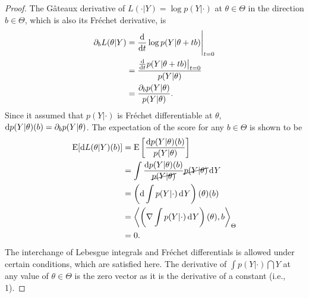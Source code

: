 \begin{proof}
  


The Gâteaux derivative of $L(\cdot|Y) = \log p(Y|\cdot)$ at $\theta\in\Theta$ in the direction $b\in\Theta$, which is also its Fréchet derivative, is
\begin{align*}
  \partial_b L(\theta|Y) 
  &= \frac{\text{d}}{\text{d} t} \log p(Y|\theta + tb) \Bigg|_{t=0} \\
  &= \frac{\frac{\text{d}}{\text{d} t}p(Y|\theta + tb)\big|_{t=0}}{p(Y|\theta)} \\
  &= \frac{\partial_b p(Y|\theta)}{p(Y|\theta)}.
\end{align*}
Since it assumed that $p(Y|\cdot)$ is Fréchet differentiable at $\theta$, $\text{d} p(Y|\theta)(b) = \partial_b p(Y|\theta)$.
The expectation of the score for any $b\in\Theta$ is shown to be
\begin{align*}
  \operatorname{E}[\text{d} L(\theta|Y)(b)] 
  &= \operatorname{E} \left[ \frac{\text{d} p(Y|\theta)(b)}{p(Y|\theta)} \right] \\
  &= \int \frac{\text{d} p(Y|\theta)(b)}{\cancel{p(Y|\theta)}} \cancel{p(Y|\theta)} \operatorname{d}\hspace{0.5pt}\! Y \\
  &= \left(\text{d}\int p(Y|\cdot) \operatorname{d}\hspace{0.5pt}\! Y \right)(\theta)(b) \\
  &= \left\langle \left(\nabla \int p(Y|\cdot) \operatorname{d}\hspace{0.5pt}\! Y\right)(\theta)  , b \right\rangle_\Theta \\
  &=0.
\end{align*}
The interchange of Lebesgue integrals and Fréchet differentials is allowed under certain conditions\footnotemark, which are satisfied here.
The derivative of $\int p(Y|\cdot)\dint Y$ at any value of $\theta\in\Theta$ is the zero vector as it is the derivative of a constant (i.e., 1).


\end{proof}
